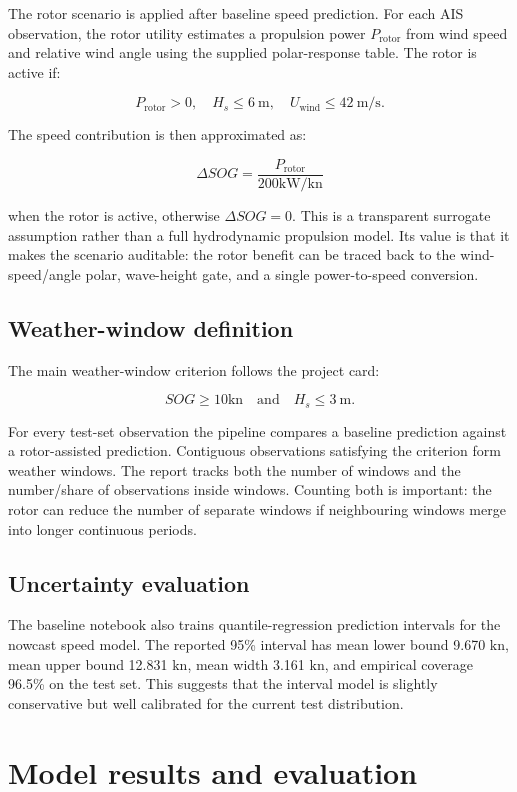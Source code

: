 \documentclass[10pt,a4paper]{article}
\newcommand{\kn}{\ensuremath{\mathrm{kn}}}
\newcommand{\kw}{\ensuremath{\mathrm{kW}}}
\newcommand{\sog}{SOG}
\begin{document}
The rotor scenario is applied after baseline speed prediction. For each AIS
observation, the rotor utility estimates a propulsion power
$P_\mathrm{rotor}$ from wind speed and relative wind angle using the supplied
polar-response table. The rotor is active if:

\[
P_\mathrm{rotor} > 0,\quad H_s \leq 6 \mathrm{\ m},\quad
U_\mathrm{wind} \leq 42 \mathrm{\ m/s}.
\]

The speed contribution is then approximated as:

\[
\Delta \sog = \frac{P_\mathrm{rotor}}{200 \kw / \kn}
\]

when the rotor is active, otherwise $\Delta \sog = 0$. This is a transparent
surrogate assumption rather than a full hydrodynamic propulsion model. Its value
is that it makes the scenario auditable: the rotor benefit can be traced back to
the wind-speed/angle polar, wave-height gate, and a single power-to-speed
conversion.

\subsection{Weather-window definition}

The main weather-window criterion follows the project card:

\[
\sog \geq 10 \kn \quad \mathrm{and} \quad H_s \leq 3 \mathrm{\ m}.
\]

For every test-set observation the pipeline compares a baseline prediction
against a rotor-assisted prediction. Contiguous observations satisfying the
criterion form weather windows. The report tracks both the number of windows and
the number/share of observations inside windows. Counting both is important:
the rotor can reduce the number of separate windows if neighbouring windows
merge into longer continuous periods.

\subsection{Uncertainty evaluation}

The baseline notebook also trains quantile-regression prediction intervals for
the nowcast speed model. The reported 95\% interval has mean lower bound
9.670 \kn{}, mean upper bound 12.831 \kn{}, mean width 3.161 \kn{}, and empirical
coverage 96.5\% on the test set. This suggests that the interval model is
slightly conservative but well calibrated for the current test distribution.


\section{Model results and evaluation}
\end{document}
